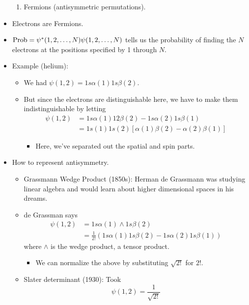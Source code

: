\documentclass[../notes.tex]{subfiles}
\begin{document}
\begin{itemize}
\begin{enumerate}
        \item Fermions (antisymmetric permutations).
    \end{enumerate}
    \item Electrons are Fermions.
    \item $\operatorname{Prob}=\psi^*(1,2,\dots,N)\psi(1,2,\dots,N)$ tells us the probability of finding the $N$ electrons at the positions specified by 1 through $N$.
    \item Example (helium):
    \begin{itemize}
        \item We had $\psi(1,2)=1s\alpha(1)1s\beta(2)$.
        \item But since the electrons are distinguishable here, we have to make them indistinguishable by letting
        \begin{align*}
            \psi(1,2) &= 1s\alpha(1)12\beta(2)-1s\alpha(2)1s\beta(1)\\
            &= 1s(1)1s(2)[\alpha(1)\beta(2)-\alpha(2)\beta(1)]
        \end{align*}
        \begin{itemize}
            \item Here, we've separated out the spatial and spin parts.
        \end{itemize}
    \end{itemize}
    \item How to represent antisymmetry.
    \begin{itemize}
        \item Grassmann Wedge Product (1850s): Herman de Grassmann was studying linear algebra and would learn about higher dimensional spaces in his dreams.
        \item de Grassman says
        \begin{align*}
            \psi(1,2) &= 1s\alpha(1)\wedge 1s\beta(2)\\
            &= \frac{1}{2!}(1s\alpha(1)1s\beta(2)-1s\alpha(2)1s\beta(1))
        \end{align*}
        where $\wedge$ is the wedge product, a tensor product.
        \begin{itemize}
            \item We can normalize the above by substituting $\sqrt{2!}$ for $2!$.
        \end{itemize}
        \item Slater determinant (1930): Took
        \begin{equation*}
            \psi(1,2) = \frac{1}{\sqrt{2!}}

\end{equation*}
\end{itemize}
\end{itemize}
\end{document}

